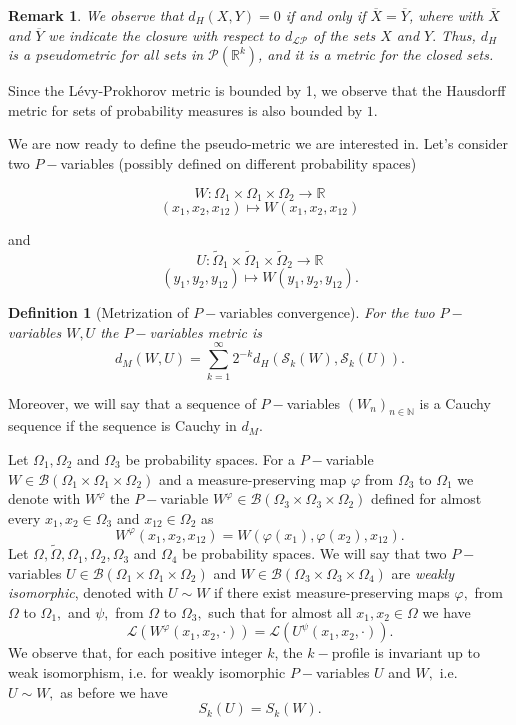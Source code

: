\documentclass[11pt]{article}
\newtheorem{definition}[theorem]{Definition}
\newtheorem{remark}[theorem]{Remark}
\def\R{\mathbb{R}}
\def\N{\mathbb{N}}
\newcommand{\cB}{{\mathcal B}}  %
\begin{document}
\begin{remark}
We observe that $d_{H}(X, Y)=0$ if and only if $\overline{X}=\overline{Y}$, where with $\overline{X}$ and $\overline{Y}$ we indicate the closure with respect to $d_{\mathcal{LP}}$ of the sets $X$ and $Y.$ Thus, $d_{H}$ is a pseudometric for all sets in $\mathcal{P}\left(\mathbb{R}^{k}\right)$, and it is a metric for the closed sets.
\end{remark}

Since the Lévy-Prokhorov metric is bounded by 1, we observe that the Hausdorff metric for sets of probability measures is also bounded by $1$.\newline

We are now ready to define the pseudo-metric we are interested in. Let's consider two $P-$variables (possibly defined on different probability spaces)

 $$W:\Omega_1\times \Omega_1 \times \Omega_2\rightarrow \R$$
    $$(x_1,x_2,x_{12})\mapsto W(x_1,x_2,x_{12})$$


and  $$U:\widetilde\Omega_1\times \widetilde\Omega_1 \times \widetilde\Omega_2\rightarrow \R$$
    $$(y_1,y_2,y_{12})\mapsto W(y_1,y_2,y_{12}).$$
\begin{definition}[Metrization of $P-$variables convergence] For the two $P-$variables $W, U$ the \emph{$P-$variables metric} is
$$
d_{M}(W, U)=\sum_{k=1}^{\infty} 2^{-k} d_{H}\left(\mathcal{S}_{k}(W), \mathcal{S}_{k}(U)\right).
$$
\end{definition}

Moreover, we will say that a sequence of $P-$variables $(W_n)_{n\in\N}$ is a Cauchy sequence if the sequence is Cauchy in $d_M$. \newline

Let $\Omega_1,\Omega_2$ and $\Omega_3$ be probability spaces. For a $P-$variable $W\in \cB(\Omega_1\times \Omega_1\times \Omega_2)$ and a measure-preserving map $\varphi$ from $\Omega_3$ to $\Omega_1$ we denote with $W^{\varphi}$ the $P-$variable $W^{\varphi}\in \cB(\Omega_3\times \Omega_3\times \Omega_2)$ defined for almost every $x_1,x_2\in \Omega_3$ and $x_{12}\in \Omega_2$ as $$
W^{\varphi}(x_1,x_2,x_{12})=W(\varphi(x_1),\varphi(x_2),x_{12}).
$$
Let $\Omega, \widetilde \Omega, \Omega_1,\Omega_2,\Omega_3$ and $\Omega_4$ be probability spaces. We will say that two $P-$variables $U\in \cB(\Omega_1\times \Omega_1\times \Omega_2)$ and $W\in \cB(\Omega_3\times \Omega_3\times \Omega_4)$ are \emph{weakly isomorphic}, denoted with $U\sim W$ if there exist measure-preserving maps $\varphi,$ from $\Omega$ to $\Omega_1,$ and $\psi,$ from $\Omega$ to $\Omega_3,$ such that for almost all $x_1,x_2\in \Omega$ we have $$\mathcal{L}(W^{\varphi}(x_1,x_2,\cdot))=\mathcal{L}(U^{\psi}(x_1,x_2,\cdot)).$$
We observe that, for each positive integer $k$, the $k-$profile is invariant up to weak isomorphism, i.e. for weakly isomorphic $P-$variables $U$ and $W,$ i.e.\ $U\sim W,$ as before we have 
\begin{equation}\label{Eq:EquivKprofWeakIso}
    S_k(U)=S_k(W).
\end{equation}
\end{document}
